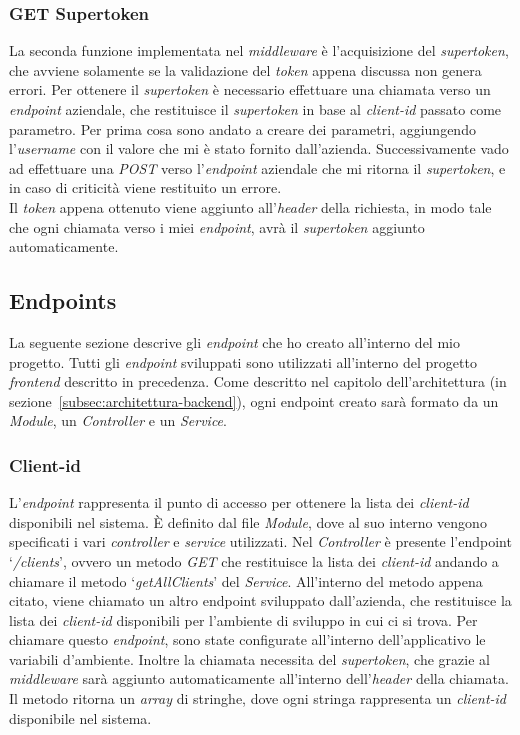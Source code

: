 \subsubsection{GET Supertoken}
La seconda funzione implementata nel \textit{middleware} è l'acquisizione del \textit{supertoken}, che avviene solamente se la validazione del \textit{token} appena discussa non genera errori.
Per ottenere il \textit{supertoken} è necessario effettuare una chiamata verso un \textit{endpoint} aziendale, che restituisce il \textit{supertoken} in base al \textit{client-id} passato come parametro.
Per prima cosa sono andato a creare dei parametri, aggiungendo l'\textit{username} con il valore che mi è stato fornito dall'azienda.
Successivamente vado ad effettuare una \textit{POST} verso l'\textit{endpoint} aziendale che mi ritorna il \textit{supertoken}, e in caso di criticità viene restituito un errore.\\
Il \textit{token} appena ottenuto viene aggiunto all'\textit{header} della richiesta, in modo tale che ogni chiamata verso i miei \textit{endpoint}, avrà il \textit{supertoken} aggiunto automaticamente.


\subsection{Endpoints}\label{subsec:endpoints}
La seguente sezione descrive gli \textit{endpoint} che ho creato all'interno del mio progetto. Tutti gli \textit{endpoint} sviluppati 
sono utilizzati all'interno del progetto \textit{frontend} descritto in precedenza.
Come descritto nel capitolo dell'architettura (in sezione~\ref{subsec:architettura-backend}), ogni endpoint creato sarà formato da un \textit{Module}, un \textit{Controller} e un \textit{Service}.

\subsubsection{Client-id}
L'\textit{endpoint} rappresenta il punto di accesso per ottenere la lista dei \textit{client-id} disponibili nel sistema.
È definito dal file \textit{Module}, dove al suo interno vengono specificati i vari \textit{controller} e \textit{service} utilizzati.
Nel \textit{Controller} è presente l'endpoint `\textit{/clients}', ovvero un metodo \textit{GET} che restituisce la lista dei \textit{client-id} andando
a chiamare il metodo `\textit{getAllClients}' del \textit{Service}.
All’interno del metodo appena citato, viene chiamato un altro endpoint sviluppato dall'azienda, che restituisce 
la lista dei \textit{client-id} disponibili per l'ambiente di sviluppo in cui ci si trova.
Per chiamare questo \textit{endpoint}, sono state configurate all'interno dell'applicativo le variabili d'ambiente.
Inoltre la chiamata necessita del \textit{supertoken}, che grazie al \textit{middleware} sarà aggiunto automaticamente all'interno 
dell'\textit{header} della chiamata.
Il metodo ritorna un \textit{array} di stringhe, dove ogni stringa rappresenta un \textit{client-id} disponibile nel sistema.

